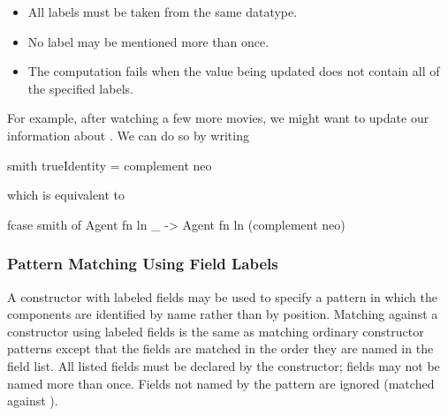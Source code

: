 \begin{itemize}
\item All labels must be taken from the same datatype.
\item No label may be mentioned more than once.
\item The computation fails when the value being updated does not contain all of the specified
labels.
\end{itemize}


\noindent
For example, after watching a few more movies, we might want to update
our information about . We can do so by writing
\begin{curry}
smith { trueIdentity = complement neo }
\end{curry}
which is equivalent to
\begin{curry}
fcase smith of
  Agent fn ln _ -> Agent fn ln (complement neo)
\end{curry}

\subsubsection{Pattern Matching Using Field Labels}\label{flab-pat}

A constructor with labeled fields may be used to specify a pattern in
which the components are identified by name rather than by position.
Matching against a constructor using labeled fields is the same as
matching ordinary constructor patterns except that the fields are
matched in the order they are named in the field list. All listed
fields must be declared by the constructor; fields may not be named
more than once. Fields not named by the pattern are ignored (matched
against \code{\us}).

